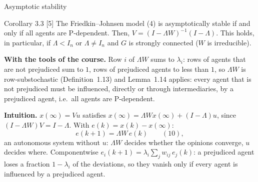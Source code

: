 \begin{frame}[label=bk-fj-stab]{Asymptotic stability}
  \scriptsize
  \begin{block}{Corollary 3.3 [5]}
    The Friedkin--Johnsen model (4) is asymptotically stable if and only if all agents are
    P-dependent. Then, $V = (I - \Lambda W)^{-1}(I - \Lambda)$. This holds, in particular,
    if $\Lambda < I_n$ or $\Lambda \neq I_n$ and $G$ is strongly connected ($W$ is
    irreducible).
  \end{block}
  \textbf{With the tools of the course.} Row $i$ of $\Lambda W$ sums to $\lambda_i$: rows of
  agents that are not prejudiced sum to $1$, rows of prejudiced agents to less than $1$, so
  $\Lambda W$ is row-substochastic (Definition~1.13) and Lemma~1.14 applies: every agent that
  is not prejudiced must be influenced, directly or through intermediaries, by a prejudiced
  agent, i.e.\ all agents are P-dependent.

  \medskip
  \textbf{Intuition.} $x(\infty) = Vu$ satisfies $x(\infty) = \Lambda W x(\infty) + (I -
  \Lambda)u$, since $(I - \Lambda W)V = I - \Lambda$. With $e(k) = x(k) - x(\infty)$:
  \[ e(k+1) = \Lambda W\, e(k) \qquad (10), \]
  an autonomous system without $u$: $\Lambda W$ decides whether the opinions converge, $u$
  decides where. Componentwise $e_i(k+1) = \lambda_i \sum_j w_{ij}\, e_j(k)$: a prejudiced
  agent loses a fraction $1 - \lambda_i$ of the deviations, so they vanish only if every
  agent is influenced by a prejudiced agent.
\end{frame}

